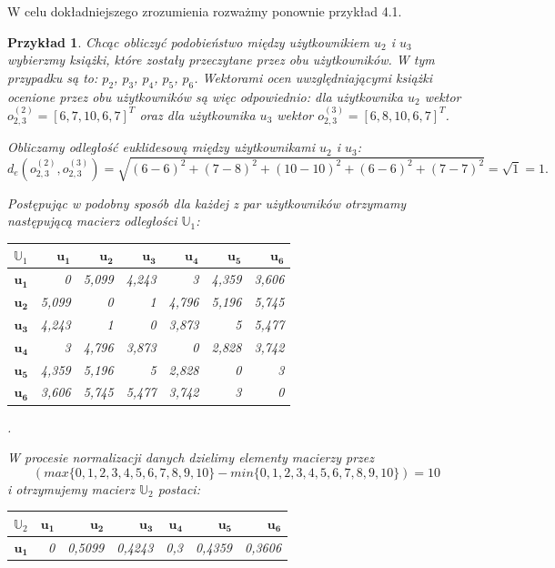 \documentclass[12pt,a4paper]{report}
\newtheorem{przyklad}{Przykład}[chapter]
\begin{document}
W celu dokładniejszego zrozumienia rozważmy ponownie przykład 4.1.

\begin{przyklad}
Chcąc obliczyć podobieństwo między użytkownikiem $u_2$ i $u_3$ wybierzmy książki, które zostały przeczytane przez obu użytkowników. W tym przypadku są to: $p_2$, $p_3$, $p_4$, $p_5$, $p_6$. Wektorami ocen uwzględniającymi książki ocenione przez obu użytkowników są więc odpowiednio: dla użytkownika $u_2$ wektor $o_{2,3} ^{(2)} = [6, 7, 10, 6, 7] ^ T$ oraz dla użytkownika $u_3$ wektor $o_{2,3}^{(3)} = [6, 8, 10, 6, 7] ^ T$.

Obliczamy odległość euklidesową między użytkownikami $u_2$ i $u_3$: 
$$
d_{e}(o_{2,3}^{(2)},o_{2,3}^{(3)}) = \sqrt{(6-6)^2 + (7-8)^2 + (10-10)^2 + (6-6)^2 + (7-7)^2} = \sqrt{1} = 1.
$$

Postępując w podobny sposób dla każdej z par użytkowników otrzymamy następującą macierz odległości $\mathbb{U}_1$:
\begin{center}
\begin{tabular}{|r|r|r|r|r|r|r|} \hline
$\mathbb{U}_1$ & $\mathbf{u_1}$ & $\mathbf{u_2}$ & $\mathbf{u_3}$ & $\mathbf{u_4}$ & $\mathbf{u_5}$ & $\mathbf{u_6}$ \\
\hline
$\mathbf{u_1}$ & 0 & 5,099 & 4,243 & 3 & 4,359 & 3,606 \\
\hline
$\mathbf{u_2}$ & 5,099 & 0 & 1 & 4,796 & 5,196 & 5,745 \\
\hline
$\mathbf{u_3}$ & 4,243 & 1 & 0 & 3,873 & 5 & 5,477 \\
\hline
$\mathbf{u_4}$ & 3 & 4,796 & 3,873 & 0 & 2,828 & 3,742  \\
\hline 
$\mathbf{u_5}$ & 4,359 & 5,196 & 5 & 2,828 & 0 & 3 \\
\hline 
$\mathbf{u_6}$ & 3,606 & 5,745 & 5,477 & 3,742 & 3 & 0  \\
\hline 
\end{tabular}.
\end{center}
W procesie normalizacji danych dzielimy elementy macierzy przez 
$$
(max\{0,1,2,3,4,5,6,7,8,9,10\} - min\{0,1,2,3,4,5,6,7,8,9,10\}) = 10
$$ 
i otrzymujemy macierz $\mathbb{U}_2$ postaci:
\begin{center}
\begin{tabular}{|r|r|r|r|r|r|r|} \hline
$\mathbb{U}_2$ & $\mathbf{u_1}$ & $\mathbf{u_2}$ & $\mathbf{u_3}$ & $\mathbf{u_4}$ & $\mathbf{u_5}$ & $\mathbf{u_6}$ \\
\hline
$\mathbf{u_1}$ & 0 & 0,5099 & 0,4243 & 0,3 & 0,4359 & 0,3606 \\

\end{tabular}
\end{center}
\end{przyklad}
\end{document}
